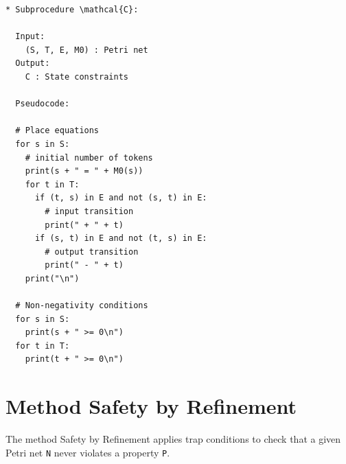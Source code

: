 \documentclass{article}
\begin{document}
\newpage

\begin{verbatim}
* Subprocedure \mathcal{C}:

  Input:
    (S, T, E, M0) : Petri net
  Output:
    C : State constraints

  Pseudocode:
  
  # Place equations
  for s in S:
    # initial number of tokens
    print(s + " = " + M0(s))
    for t in T:
      if (t, s) in E and not (s, t) in E:
        # input transition
        print(" + " + t)
      if (s, t) in E and not (t, s) in E:
        # output transition
        print(" - " + t)
    print("\n")
  
  # Non-negativity conditions
  for s in S:
    print(s + " >= 0\n")
  for t in T:
    print(t + " >= 0\n")
\end{verbatim}

\newpage

\section{Method Safety by Refinement}

The method Safety by Refinement applies trap conditions to check that a given Petri net \verb=N= never violates a property \verb=P=.
\end{document}
